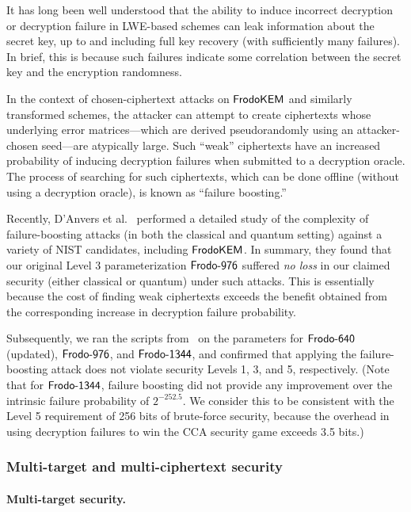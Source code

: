 \documentclass{iacrcc}
\begin{document}
It has long been well understood that the ability to induce incorrect
decryption or decryption failure in LWE-based schemes can leak
information about the secret key, up to and including full key
recovery (with sufficiently many failures). In brief, this is because
such failures indicate some correlation between the secret key and the
encryption randomness.

In the context of chosen-ciphertext attacks on $\textsf{\upshape\mdseries FrodoKEM}$ and
similarly transformed schemes, the attacker can attempt to create
ciphertexts whose underlying error matrices---which are derived
pseudorandomly using an attacker-chosen seed---are atypically
large. Such ``weak'' ciphertexts have an increased probability of
inducing decryption failures when submitted to a decryption
oracle. The process of searching for such ciphertexts, which can be
done offline (without using a decryption oracle), is known as
``failure boosting.''

Recently, D'Anvers et al.~\cite{PKC:DGJNVV19} performed a detailed study of
the complexity of failure-boosting attacks (in both the classical and
quantum setting) against a variety of NIST candidates, including
$\textsf{\upshape\mdseries FrodoKEM}$. In summary, they found that our original Level 3
parameterization $\textsf{\upshape\mdseries Frodo-976}$ suffered \emph{no loss} in our
claimed security (either classical or quantum) under such
attacks. This is essentially because the cost of finding weak
ciphertexts exceeds the benefit obtained from the corresponding
increase in decryption failure probability.

Subsequently, we ran the scripts from~\cite{PKC:DGJNVV19} on the
parameters for $\textsf{\upshape\mdseries Frodo-640}$ (updated), $\textsf{\upshape\mdseries Frodo-976}$, and $\textsf{\upshape\mdseries Frodo-1344}$, and
confirmed that applying the failure-boosting attack does not violate security
Levels 1, 3, and 5, respectively. (Note that for $\textsf{\upshape\mdseries Frodo-1344}$,
failure boosting did not provide any improvement over the intrinsic
failure probability of $2^{-252.5}$. We consider this to be consistent
with the Level 5 requirement of 256 bits of brute-force security, because the overhead in using
decryption failures to win the CCA security game exceeds 3.5 bits.)


\color{red}
\subsubsection{Multi-target and multi-ciphertext security}\label{sec:multi-attacks}

\paragraph{Multi-target security.}
\end{document}

